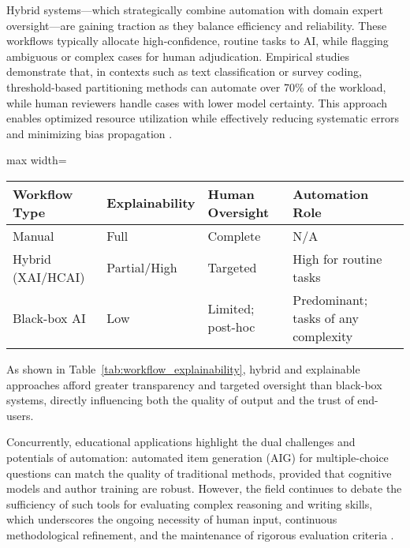 \documentclass[sigconf]{acmart}
\begin{document}
Hybrid systems—which strategically combine automation with domain expert oversight—are gaining traction as they balance efficiency and reliability. These workflows typically allocate high-confidence, routine tasks to AI, while flagging ambiguous or complex cases for human adjudication. Empirical studies demonstrate that, in contexts such as text classification or survey coding, threshold-based partitioning methods can automate over 70\% of the workload, while human reviewers handle cases with lower model certainty. This approach enables optimized resource utilization while effectively reducing systematic errors and minimizing bias propagation \cite{ref82,ref83,ref86,ref88,ref94,ref96,ref97}. 

\begin{table*}[htbp]
\centering
\caption{Comparison of Explainability and Oversight Across Workflow Types}
\label{tab:workflow_explainability}
\begin{adjustbox}{max width=\textwidth}
\begin{tabular}{@{}llll@{}}
\toprule
\textbf{Workflow Type} & \textbf{Explainability} & \textbf{Human Oversight} & \textbf{Automation Role} \\
\midrule
Manual & Full & Complete & N/A \\
Hybrid (XAI/HCAI) & Partial/High & Targeted & High for routine tasks \\
Black-box AI & Low & Limited; post-hoc & Predominant; tasks of any complexity \\
\bottomrule
\end{tabular}
\end{adjustbox}
\end{table*}

As shown in Table~\ref{tab:workflow_explainability}, hybrid and explainable approaches afford greater transparency and targeted oversight than black-box systems, directly influencing both the quality of output and the trust of end-users.

Concurrently, educational applications highlight the dual challenges and potentials of automation: automated item generation (AIG) for multiple-choice questions can match the quality of traditional methods, provided that cognitive models and author training are robust. However, the field continues to debate the sufficiency of such tools for evaluating complex reasoning and writing skills, which underscores the ongoing necessity of human input, continuous methodological refinement, and the maintenance of rigorous evaluation criteria \cite{ref76,ref78,ref80,ref81}.
\end{document}
